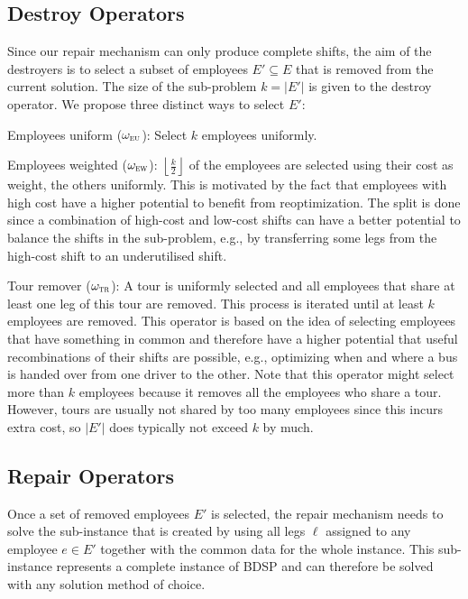 \documentclass[]{amsart}
\newcommand{\abs}[1]{\left\lvert #1 \right\rvert}
\newcommand{\size}{k}
\newcommand{\tr}{$\omega_\textsc{tr}$\xspace}
\newcommand{\eu}{$\omega_\textsc{eu}$\xspace}
\newcommand{\ew}{$\omega_\textsc{ew}$\xspace}
\theoremstyle{plain}
\begin{document}
\subsection{Destroy Operators}

Since our repair mechanism can only produce complete shifts, the aim of the destroyers is to select a subset of employees $E'\subseteq E$ that is removed from the current solution. The size of the sub-problem $\size=\abs{E'}$ is given to the destroy operator. We propose three distinct ways to select $E'$:

\begin{description}
	\item Employees uniform (\eu): Select $\size$ employees uniformly. 
	\item Employees weighted (\ew): $\left\lfloor\frac{\size}{2}\right\rfloor$ of the employees are selected using their cost as weight, the others uniformly. This is motivated by the fact that employees with high cost have a higher potential to benefit from reoptimization. The split is done since a combination of high-cost and low-cost shifts can have a better potential to balance the shifts in the sub-problem, e.g., by transferring some legs from the high-cost shift to an underutilised shift.
 \item Tour remover (\tr): A tour is uniformly selected and all employees that share at least one leg of this tour are removed. This process is iterated until at least $\size$ employees are removed. This operator is based on the idea of selecting employees that have something in common and therefore have a higher potential that useful recombinations of their shifts are possible, e.g., optimizing when and where a bus is handed over from one driver to the other. Note that this operator might select more than $\size$ employees because it  removes all the employees who share a tour. However,  tours are usually not shared by too many employees since this incurs extra cost, so $\abs{E'}$ does typically not exceed $\size$ by much.
\end{description}

\subsection{Repair Operators}

Once a set of removed employees $E'$ is selected, the repair mechanism needs to solve the sub-instance that is created by using all legs $\ell$ assigned to any employee $e\in E'$ together with the common data for the whole instance. %
This sub-instance represents a complete instance of BDSP and can therefore be solved with any solution method of choice.
\end{document}
